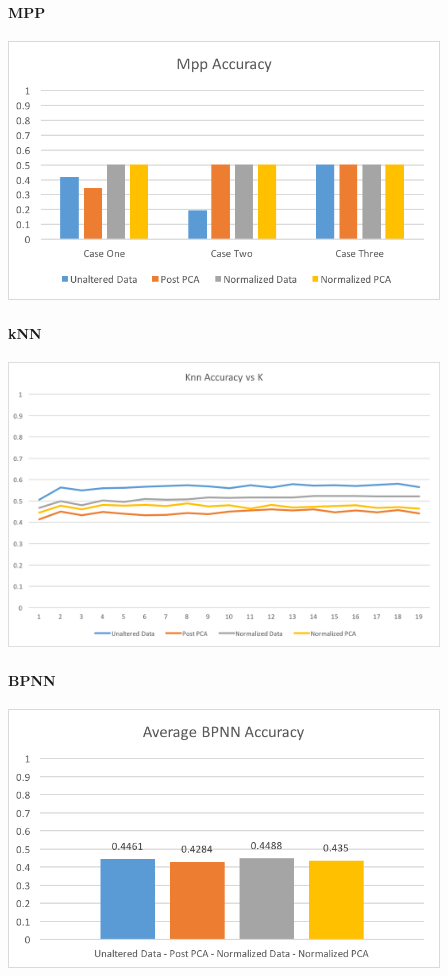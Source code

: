 \documentclass{article}
\begin{document}
\paragraph{MPP}

\centerline{\includegraphics[width = 4.5in]{images/mpp-results}}

\paragraph{kNN}

\centerline{\includegraphics[width = 4.5in]{images/knn-results}}

\paragraph{BPNN}

\centerline{\includegraphics[width = 4.5in]{images/bpnn-results}}
\end{document}
